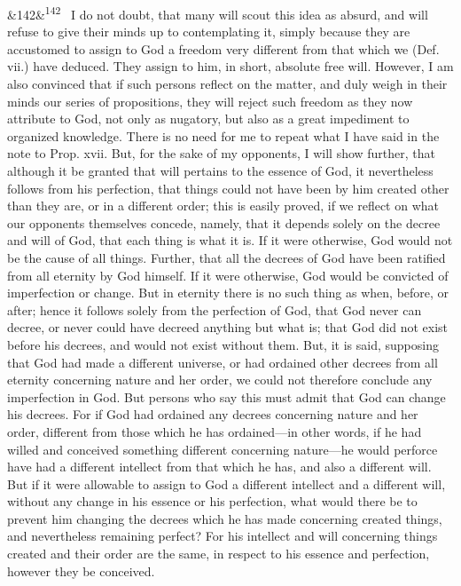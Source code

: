 \documentclass[12pt]{article}
\newcommand{\para}[1][]{\par\noindent\ifx&#1&\else\textsuperscript{\footnotesize #1}~\fi}
\begin{document}
\para[142] I do not doubt, that many will scout this idea as absurd, and will refuse to give their minds up to contemplating it, simply because they are accustomed to assign to God a freedom very different from that which we (Def. vii.) have deduced. They assign to him, in short, absolute free will. However, I am also convinced that if such persons reflect on the matter, and duly weigh in their minds our series of propositions, they will reject such freedom as they now attribute to God, not only as nugatory, but also as a great impediment to organized knowledge. There is no need for me to repeat what I have said in the note to Prop. xvii. But, for the sake of my opponents, I will show further, that although it be granted that will pertains to the essence of God, it nevertheless follows from his perfection, that things could not have been by him created other than they are, or in a different order; this is easily proved, if we reflect on what our opponents themselves concede, namely, that it depends solely on the decree and will of God, that each thing is what it is. If it were otherwise, God would not be the cause of all things. Further, that all the decrees of God have been ratified from all eternity by God himself. If it were otherwise, God would be convicted of imperfection or change. But in eternity there is no such thing as when, before, or after; hence it follows solely from the perfection of God, that God never can decree, or never could have decreed anything but what is; that God did not exist before his decrees, and would not exist without them. But, it is said, supposing that God had made a different universe, or had ordained other decrees from all eternity concerning nature and her order, we could not therefore conclude any imperfection in God. But persons who say this must admit that God can change his decrees. For if God had ordained any decrees concerning nature and her order, different from those which he has ordained---in other words, if he had willed and conceived something different concerning nature---he would perforce have had a different intellect from that which he has, and also a different will. But if it were allowable to assign to God a different intellect and a different will, without any change in his essence or his perfection, what would there be to prevent him changing the decrees which he has made concerning created things, and nevertheless remaining perfect? For his intellect and will concerning things created and their order are the same, in respect to his essence and perfection, however they be conceived.
\end{document}
